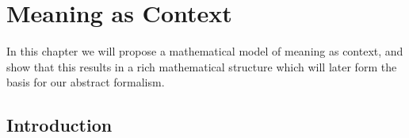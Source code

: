 \documentclass[12pt]{report}
\begin{document}
\chapter{Meaning as Context}





In this chapter we will propose a mathematical model of meaning as context, and show that this results in a rich mathematical structure which will later form the basis for our abstract formalism.

\section{Introduction}
\end{document}
